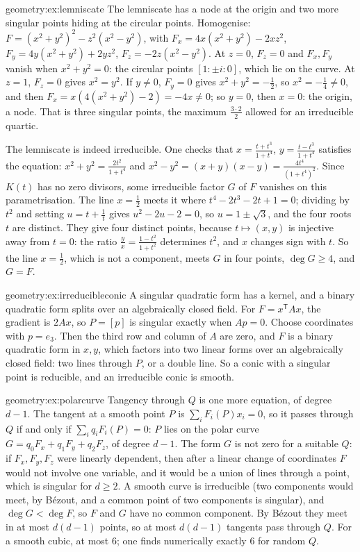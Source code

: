 \begin{solution}{geometry:ex:lemniscate}
\idea The lemniscate has a node at the origin and two more singular points hiding at the circular points.
\writeup Homogenise: $F=(x^2+y^2)^2-z^2(x^2-y^2)$, with $F_x=4x(x^2+y^2)-2xz^2$, $F_y=4y(x^2+y^2)+2yz^2$, $F_z=-2z(x^2-y^2)$. At $z=0$, $F_z=0$ and $F_x,F_y$
vanish when $x^2+y^2=0$: the circular points $[1:\pm i:0]$, which lie on the curve. At $z=1$, $F_z=0$ gives $x^2=y^2$. If $y\ne0$, $F_y=0$ gives
$x^2+y^2=-\frac12$, so $x^2=-\frac14\ne0$, and then $F_x=x(4(x^2+y^2)-2)=-4x\ne0$; so $y=0$, then $x=0$: the origin, a node. That is three singular points, the
maximum $\frac{3\cdot2}2$ allowed for an irreducible quartic.

The lemniscate is indeed irreducible. One checks that $x=\frac{t+t^3}{1+t^4}$, $y=\frac{t-t^3}{1+t^4}$ satisfies the equation: $x^2+y^2=\frac{2t^2}{1+t^4}$ and
$x^2-y^2=(x+y)(x-y)=\frac{4t^4}{(1+t^4)^2}$. Since $K(t)$ has no zero divisors, some irreducible factor $G$ of $F$ vanishes on this parametrisation. The line
$x=\frac12$ meets it where $t^4-2t^3-2t+1=0$; dividing by $t^2$ and setting $u=t+\frac1t$ gives $u^2-2u-2=0$, so $u=1\pm\sqrt3$, and the four roots $t$ are
distinct. They give four distinct points, because $t\mapsto(x,y)$ is injective away from $t=0$: the ratio $\frac yx=\frac{1-t^2}{1+t^2}$ determines $t^2$, and
$x$ changes sign with $t$. So the line $x=\frac12$, which is not a component, meets $G$ in four points, $\deg G\ge4$, and $G=F$.
\end{solution}

\begin{solution}{geometry:ex:irreducibleconic}
\idea A singular quadratic form has a kernel, and a binary quadratic form splits over an algebraically closed field.
\writeup For $F=x^{\mathsf T}Ax$, the gradient is $2Ax$, so $P=[p]$ is singular exactly when $Ap=0$. Choose coordinates with $p=e_3$. Then the third row and column of
$A$ are zero, and $F$ is a binary quadratic form in $x,y$, which factors into two linear forms over an algebraically closed field: two lines through $P$, or a
double line. So a conic with a singular point is reducible, and an irreducible conic is smooth.
\end{solution}

\begin{solution}{geometry:ex:polarcurve}
\idea Tangency through $Q$ is one more equation, of degree $d-1$.
\writeup The tangent at a smooth point $P$ is $\sum_iF_i(P)x_i=0$, so it passes through $Q$ if and only if $\sum_iq_iF_i(P)=0$: $P$ lies on the polar curve
$G=q_0F_x+q_1F_y+q_2F_z$, of degree $d-1$. The form $G$ is not zero for a suitable $Q$: if $F_x,F_y,F_z$ were linearly dependent, then after a linear change of
coordinates $F$ would not involve one variable, and it would be a union of lines through a point, which is singular for $d\ge2$. A smooth curve is irreducible
(two components would meet, by B\'ezout, and a common point of two components is singular), and $\deg G<\deg F$, so $F$ and $G$ have no common component. By
B\'ezout they meet in at most $d(d-1)$ points, so at most $d(d-1)$ tangents pass through $Q$. For a smooth cubic, at most $6$; one finds numerically
exactly $6$ for random $Q$.
\end{solution}

